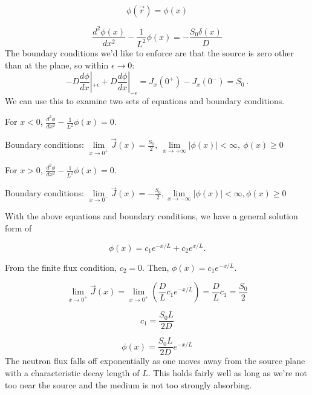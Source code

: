\documentclass[12pt]{article}
\newcommand{\rvec}{\ensuremath{\vec{r}}}
\begin{document}
\begin{equation*}
\phi(\rvec) = \phi(x)
\end{equation*}

\begin{equation*}
\frac{d^2\phi(x)}{dx^2} - \frac{1}{L^2}\phi(x) = -\frac{S_0\delta(x)}{D}
\end{equation*}
The boundary conditions we'd like to enforce are that the source is zero other than at the plane, so within $\epsilon \rightarrow 0$:
%
\[-D \frac{d \phi}{dx}|_{+\epsilon} + D \frac{d \phi}{dx}|_{-\epsilon} = 
J_x(0^+) - J_x(0^-) = S_0\:.\]
%
We can use this to examine two sets of equations and boundary conditions.


For $x < 0$, $\frac{d^2\phi}{dx^2} - \frac{1}{L^2}\phi(x) = 0$.

Boundary conditions: 
$\lim\limits_{x\rightarrow 0^+}\vec{J}(x) = \frac{S_0}{2}, \: \lim\limits_{x\rightarrow +\infty}|\phi(x)|<\infty, \: \phi(x) \geq 0$

For $x > 0$, \: $\frac{d^2\phi}{dx^2} - \frac{1}{L^2}\phi(x) = 0$.

Boundary conditions: 
$\lim\limits_{x\rightarrow 0^-}\vec{J}(x) = -\frac{S_0}{2}, \lim\limits_{x\rightarrow -\infty}|\phi(x)|<\infty, \phi(x) \geq 0$

With the above equations and boundary conditions, we have a general solution form of

\begin{equation*}
\phi(x) = c_1e^{-x/L} + c_2e^{x/L}.
\end{equation*}

From the finite flux condition, $c_2 = 0$. Then, $\phi(x) = c_1e^{-x/L}$.

\begin{equation*}
\lim\limits_{x\to 0^+} \vec{J}(x) = \lim\limits_{x\to 0^+}\left(\frac{D}{L}c_1e^{-x/L}\right) = 
\frac{D}{L}c_1 = \frac{S_0}{2}
\end{equation*}

\begin{equation*}
c_1 = \frac{S_0 L}{2D}
\end{equation*}

\begin{equation*}
\phi(x) = \frac{S_0L}{2D}e^{-x/L}
\end{equation*}
The neutron flux falls off exponentially as one moves away from the source plane with a characteristic decay length of $L$. This holds fairly well as long as we're not too near the source and the medium is not too strongly absorbing.
\end{document}
